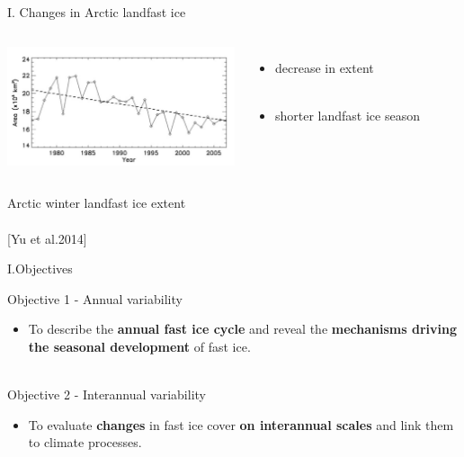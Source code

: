 \documentclass[8pt]{beamer}
\newcommand\Fontvi{\fontsize{6}{7.2}\selectfont}
\begin{document}
\setwatermark{\fontsize{125pt}{125pt}\selectfont{}}
\begin{frame}[fragile]{I. Changes in Arctic landfast ice}
	\begin{columns}
		\includegraphics[height=3.5cm]{./img/Extent_timeseries.png}\\
			\begin{itemize}
				\item decrease in extent\\~\\
				\item shorter landfast ice season
			\end{itemize}
	\end{columns}
Arctic winter landfast ice extent \\~\\
\Fontvi
[Yu et al.2014]
\end{frame}

\setwatermark{\fontsize{125pt}{125pt}\selectfont{}}
\begin{frame}[fragile]{I.Objectives}
	
		
	Objective 1 -  Annual variability
		\begin{itemize}
			\item To describe the \textbf{annual fast ice cycle} and 
		reveal the \textbf{mechanisms driving the seasonal development} of fast ice.\\~\\
		\end{itemize}
	Objective 2 - Interannual variability
		\begin{itemize}
			\item To evaluate \textbf{changes} in fast ice cover \textbf{on interannual scales} and 
		link them to climate processes.
		\end{itemize}

\end{frame}
\end{document}
